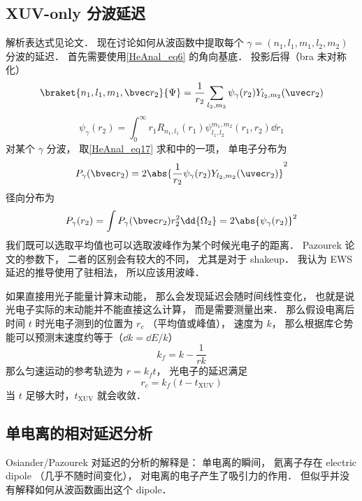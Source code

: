 \subsection{XUV-only 分波延迟}
解析表达式见论文． 现在讨论如何从波函数中提取每个 $\gamma = (n_1, l_1, m_1, l_2, m_2)$ 分波的延迟． 首先需要使用\autoref{HeAnal_eq6} 的角向基底． 投影后得（bra 未对称化）
\begin{equation}\label{HeAnal_eq17}
\braket{n_1,l_1,m_1,\bvec r_2}{\Psi} = \frac{1}{r_2} \sum_{l_2,m_2}\psi_\gamma(r_2) Y_{l_2,m_2}(\uvec r_2)
\end{equation}
\begin{equation}
\psi_\gamma(r_2) = \int_0^\infty r_1 R_{n_1,l_1}(r_1) \psi_{l_1,l_2}^{m_1,m_2}(r_1,r_2)\dd{r_1}
\end{equation}
对某个 $\gamma$ 分波， 取\autoref{HeAnal_eq17} 求和中的一项， 单电子分布为
\begin{equation}
P_\gamma(\bvec r_2) = 2\abs{\frac{1}{r_2} \psi_\gamma(r_2) Y_{l_2,m_2}(\uvec r_2)}^2
\end{equation}
径向分布为
\begin{equation}\label{HeAnal_eq16}
P_\gamma(r_2) = \int P_\gamma(\bvec r_2) r_2^2\dd{\Omega_2} = 2\abs{\psi_\gamma(r_2)}^2
\end{equation}
我们既可以选取平均值也可以选取波峰作为某个时候光电子的距离． Pazourek 论文的参数下， 二者的区别会有较大的不同， 尤其是对于 shakeup． 我认为 EWS 延迟的推导使用了驻相法， 所以应该用波峰． 

如果直接用光子能量计算末动能， 那么会发现延迟会随时间线性变化， 也就是说光电子实际的末动能并不能直接这么计算， 而是需要测量出来． 那么假设电离后时间 $t$ 时光电子测到的位置为 $r_c$ （平均值或峰值）， 速度为 $k$， 那么根据库仑势能可以预测末速度约等于（$\dd{k} = \dd{E}/k$）
\begin{equation}
k_f = k - \frac{1}{rk}
\end{equation}
那么匀速运动的参考轨迹为 $r = k_f t$， 光电子的延迟满足
\begin{equation}
r_c = k_f(t - t_\text{XUV})
\end{equation}
当 $t$ 足够大时，$t_\text{XUV}$ 就会收敛．

\subsection{单电离的相对延迟分析}

Osiander/Pazourek 对延迟的分析的解释是： 单电离的瞬间， 氦离子存在 electric dipole （几乎不随时间变化）， 对电离的电子产生了吸引力的作用． 但似乎并没有解释如何从波函数画出这个 dipole．

